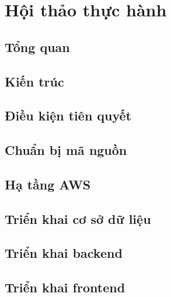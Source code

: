 \newpage

\section{Hội thảo thực hành}



\subsection{Tổng quan}


\subsection{Kiến trúc}


\subsection{Điều kiện tiên quyết}


\subsection{Chuẩn bị mã nguồn}


\subsection{Hạ tầng AWS}


\subsection{Triển khai cơ sở dữ liệu}


\subsection{Triển khai backend}


\subsection{Triển khai frontend}



